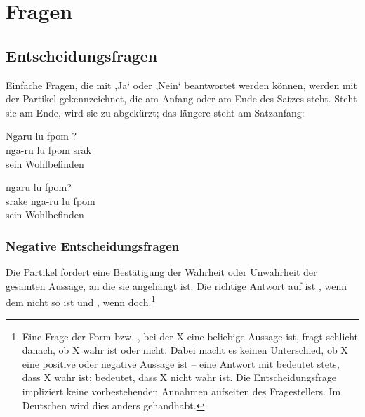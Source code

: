 \section{Fragen}
\subsection{Entscheidungsfragen} 
Einfache Fragen, die mit ,Ja‘ oder ,Nein‘ beantwortet werden können, werden mit der Partikel  gekennzeichnet, die am Anfang oder am Ende des Satzes steht. Steht sie am Ende, wird sie zu  abgekürzt; das längere  steht am Satzanfang: 

\begin{interlin}
	\glll \Npawl{}Ngaru lu fpom ? \\
	nga-ru lu fpom srak \\
	 sein Wohlbefinden  \\
\end{interlin}

\begin{interlin}
	\glll {} ngaru lu fpom? \\
	srake nga-ru lu fpom \\
	  sein Wohlbefinden \\
\end{interlin}

\subsubsection{Negative Entscheidungsfragen} 
Die Partikel  fordert eine Bestätigung der Wahrheit oder Unwahrheit der gesamten Aussage, an die sie angehängt ist. Die richtige Antwort auf   ist , wenn dem nicht so ist und , wenn doch.\footnote{Eine Frage der Form  bzw. , bei der X eine beliebige Aussage ist, fragt schlicht danach, ob X wahr ist oder nicht. Dabei macht es keinen Unterschied, ob X eine positive oder negative Aussage ist -- eine Antwort mit  bedeutet stets, dass X wahr ist;  bedeutet, dass X nicht wahr ist. Die Entscheidungsfrage impliziert keine vorbestehenden Annahmen aufseiten des Fragestellers. Im Deutschen wird dies anders gehandhabt.} 

